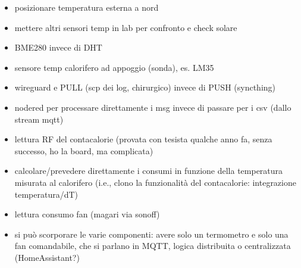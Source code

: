 \documentclass[a4paper,12pt]{article}
\begin{document}
\begin{itemize}
\item posizionare temperatura esterna a nord

\item mettere altri sensori temp in lab per confronto e check solare

\item BME280 invece di DHT

\item sensore temp calorifero ad appoggio (sonda), es. LM35

\item wireguard e PULL (scp dei log, chirurgico) invece di PUSH (syncthing)

\item nodered per processare direttamente i msg invece di passare per i csv (dallo stream mqtt)

\item lettura RF del contacalorie (provata con tesista qualche anno fa, senza successo, ho la board, ma complicata)

\item calcolare/prevedere direttamente i consumi in funzione della temperatura misurata al calorifero (i.e., clono la funzionalità del contacalorie: integrazione temperatura/dT)

\item lettura consumo fan (magari via sonoff)

\item si può scorporare le varie componenti: avere solo un termometro e solo una fan comandabile, che si parlano in MQTT, logica distribuita o centralizzata (HomeAssistant?)

\end{itemize}
\end{document}
